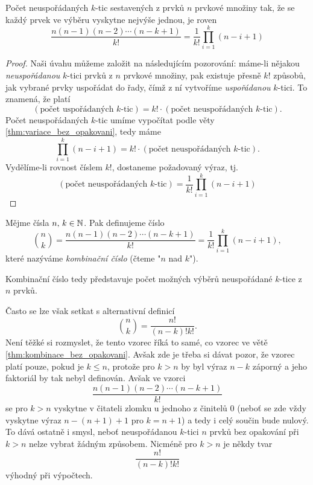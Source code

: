 \begin{theorem}\label{thm:kombinace_bez_opakovani}
    Počet neuspořádaných $k$-tic sestavených z prvků $n$ prvkové množiny tak, že se každý prvek ve výběru vyskytne nejvýše jednou, je roven
    \begin{equation*}
        \dfrac{n(n-1)(n-2)\cdots(n-k+1)}{k!}=\dfrac{1}{k!}\prod_{i=1}^{k}(n-i+1)
    \end{equation*}
\end{theorem}
\begin{proof}
    Naši úvahu můžeme založit na následujícím pozorování: máme-li nějakou \emph{neuspořádanou} $k$-tici prvků z $n$ prvkové množiny, pak existuje přesně $k!$ způsobů, jak vybrané prvky uspořádat do řady, čímž z ní vytvoříme \emph{uspořádanou} $k$-tici. To znamená, že platí
    \begin{equation*}
        (\text{počet uspořádaných $k$-tic})=k!\cdot(\text{počet neuspořádaných $k$-tic}).
    \end{equation*}
    Počet neuspořádaných $k$-tic umíme vypočítat podle věty \ref{thm:variace_bez_opakovani}, tedy máme
    \begin{equation*}
        \prod_{i=1}^{k}(n-i+1)=k!\cdot(\text{počet neuspořádaných $k$-tic}).
    \end{equation*}
    Vydělíme-li rovnost číslem $k!$, dostaneme požadovaný výraz, tj.
    \begin{equation*}
        (\text{počet neuspořádaných $k$-tic})=\dfrac{1}{k!}\prod_{i=1}^{k}(n-i+1)
    \end{equation*}
\end{proof}

\begin{definition}\label{def:kombinacni_cislo}
    Mějme čísla $n,\,k\in\mathbb{N}$. Pak definujeme číslo
    \[
        \binom{n}{k}=\dfrac{n(n-1)(n-2)\cdots(n-k+1)}{k!}=\dfrac{1}{k!}\prod_{i=1}^{k}(n-i+1),
    \]
    které nazýváme \emph{kombinační číslo} (čteme "$n$ nad $k$").
\end{definition}

\begin{remark}\label{rem:kombinacni_cislo_vypocet}
    Kombinační číslo tedy představuje počet možných výběrů neuspořádané $k$-tice z $n$ prvků.\par
    Často se lze však setkat s alternativní definicí
    \[
        \binom{n}{k}=\dfrac{n!}{(n-k)!k!}.
    \]
    Není těžké si rozmyslet, že tento vzorec říká to samé, co vzorec ve větě \ref{thm:kombinace_bez_opakovani}. Avšak zde je třeba si dávat pozor, že vzorec platí pouze, pokud je $k\leqslant n$, protože pro $k>n$ by byl výraz $n-k$ záporný a jeho faktoriál by tak nebyl definován. Avšak ve vzorci
    \[\dfrac{n(n-1)(n-2)\cdots(n-k+1)}{k!}\]
    se pro $k>n$ vyskytne v čitateli zlomku u jednoho z činitelů 0 (neboť se zde vždy vyskytne výraz $n-(n+1)+1$ pro $k=n+1$) a tedy i celý součin bude nulový. To dává ostatně i smysl, neboť neuspořádanou $k$-tici $n$ prvků bez opakování při $k>n$ nelze vybrat žádným způsobem. Nicméně pro $k>n$ je někdy tvar
    \[\dfrac{n!}{(n-k)!k!}\]
    výhodný při výpočtech.
\end{remark}

